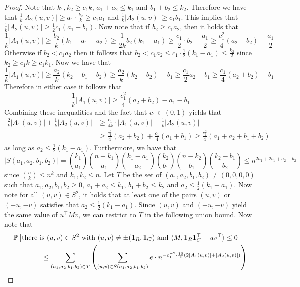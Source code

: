 \begin{proof}
Note that $k_1, k_2 \ge c_1 k$, $a_1 + a_2 \le k_1$ and $b_1 + b_2 \le k_2$. Therefore we have that $\frac{1}{k} |A_2(u, v)| \ge a_1 \cdot \frac{k_2}{k} \ge c_1 a_1$ and $\frac{1}{k} |A_2(u, v)| \ge c_1 b_1$. This implies that $\frac{1}{k} |A_2(u, v)| \ge \frac{1}{2} c_1 (a_1 + b_1)$. Now note that if $b_2 \ge c_1 a_2$, then it holds that
$$\frac{1}{k} |A_1(u, v)| \ge \frac{b_2}{k}(k_1 - a_1 - a_2) \ge \frac{1}{2k} b_2 (k_1 - a_1) \ge \frac{c_1}{2} \cdot b_2 - \frac{a_1}{2} \ge \frac{c_1^2}{4} (a_2 + b_2) - \frac{a_1}{2}$$
Otherwise if $b_2 < c_1 a_2$ then it follows that $b_2 < c_1 a_2 \le c_1 \cdot \frac{1}{2}(k_1 - a_1) \le \frac{k_2}{2}$ since $k_2 \ge c_1 k \ge c_1 k_1$. Now we have that
$$\frac{1}{k} |A_1(u, v)| \ge \frac{a_2}{k}(k_2 - b_1 - b_2) \ge \frac{a_2}{k}(k_2 - b_2) - b_1 \ge \frac{c_1}{2} a_2 - b_1 \ge \frac{c_1}{4} (a_2 + b_2) - b_1$$
Therefore in either case it follows that
$$\frac{1}{k} |A_1(u, v)| \ge \frac{c_1^2}{4}(a_2 + b_2) - a_1 - b_1$$
Combining these inequalities and the fact that $c_1 \in (0, 1)$ yields that
\begin{align*}
\frac{2}{k} |A_1(u, v)| + \frac{1}{k} |A_2(u, v)| &\ge \frac{c_1}{4k} \cdot |A_1(u, v)| + \frac{1}{k} |A_2(u, v)| \\
&\ge \frac{c_1^2}{4}(a_2 + b_2) + \frac{c_1}{4}(a_1 + b_1) \ge \frac{c_1^2}{4}(a_1 + a_2 + b_1 + b_2)
\end{align*}
as long as $a_2 \le \frac{1}{2}(k_1 - a_1)$. Furthermore, we have that
$$|S(a_1, a_2, b_1, b_2)| = \binom{k_1}{a_1} \binom{n - k_1}{a_1} \binom{k_1 - a_1}{a_2} \binom{k_2}{b_1} \binom{n - k_2}{b_1} \binom{k_2 - b_1}{b_2} \le n^{2a_1 + 2b_1 + a_2 + b_2}$$
since $\binom{n}{k} \le n^k$ and $k_1, k_2 \le n$. Let $T$ be the set of $(a_1, a_2, b_1, b_2) \neq (0, 0, 0, 0)$ such that $a_1, a_2, b_1, b_2 \ge 0$, $a_1 + a_2 \le k_1$, $b_1 + b_2 \le k_2$ and $a_2 \le \frac{1}{2}(k_1 - a_1)$. Now note for all $(u, v) \in S^2$, it holds that at least one of the pairs $(u, v)$ or $(-u, -v)$ satisfies that $a_2 \le \frac{1}{2}(k_1 - a_1)$. Since $(u, v)$ and $(-u, -v)$ yield the same value of $u^\top M v$, we can restrict to $T$ in the following union bound. Now note that
\begin{align*}
&\bP\left[ \text{there is } (u, v) \in S^2 \text{ with } (u, v) \neq \pm(\mathbf{1}_R, \mathbf{1}_C) \text{ and } \langle M, \mathbf{1}_R \mathbf{1}_C^\top - uv^\top \rangle \le 0 \right] \\
&\quad \quad \quad \quad \le \sum_{(a_1, a_2, b_1, b_2) \in T} \left( \sum_{(u, v) \in S(a_1, a_2, b_1, b_2)} e \cdot n^{-c_1^{-2} \cdot \frac{16}{k} \left( 2|A_1(u, v)| + |A_2(u, v)| \right)} \right) \\

\end{align*}
\end{proof}
